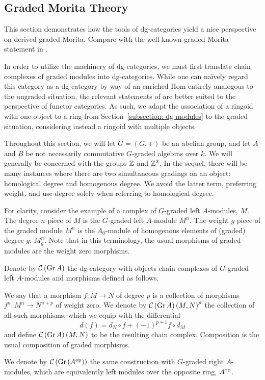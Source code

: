 \documentclass[dissertation.tex]{subfiles}
\begin{document}
\subsection{Graded Morita Theory} \label{subsection: graded Morita}

This section demonstrates how the tools of dg-categories yield a nice perspective on derived graded Morita. Compare with the well-known graded Morita statement in \cite{Zhang}. 

In order to utilize the machinery of dg-categories, we must first translate chain complexes of graded modules into dg-categories.
While one can na\"ively regard this category as a dg-category by way of an enriched Hom entirely analogous to the ungraded situation, the relevant statements of \cite{Toen} are better suited to the perspective of functor categories.
As such, we adapt the association of a ringoid with one object to a ring from Section~\ref{subsection: dg modules} to the graded situation, considering instead a ringoid with multiple objects.

Throughout this section, we will let \(G = (G, +)\) be an abelian group, and let \(A\) and \(B\) be not necessarily commutative \(G\)-graded algebras over \(k\).
We will generally be concerned with the groups \(\mathbb{Z}\) and \(\mathbb{Z}^2\).
In the sequel, there will be many instances where there are two simultaneous gradings on an object: homological degree and homogenous degree. 
We avoid the latter term, preferring weight, and use degree solely when referring to homological degree.

For clarity, consider the example of a complex of \(G\)-graded left \(A\)-modules, \(M\).
The degree \(n\) piece of \(M\) is the \(G\)-graded left \(A\)-module \(M^n\).
The weight \(g\) piece of the graded module \(M^n\) is the \(A_0\)-module of homogenous elements of (graded) degree \(g\), \(M^n_g\).
Note that in this terminology, the usual morphisms of graded modules are the weight zero morphisms.

\begin{definition}
  Denote by \(\mathcal{C}\left(\operatorname{Gr}A\right)\) the dg-category with objects chain complexes of \(G\)-graded left \(A\)-modules and morphisms defined as follows.
  
  We say that a morphism \(f \colon M \to N\) of degree \(p\) is a collection of morphisms \(f^n \colon M^n \to N^{n+p}\) of weight zero.
  We denote by \(\mathcal{C}\left(\operatorname{Gr}A\right)\left(M,N\right)^p\) the collection of all such morphisms, which we equip with the differential
  \[d(f) = d_N \circ f + (-1)^{p+1}f \circ d_M\]
  and define \(\mathcal{C}\left(\operatorname{Gr}A\right)(M,N)\) to be the resulting chain complex.
  Composition is the usual composition of graded morphisms.

  We denote by \(\mathcal{C}\left(\operatorname{Gr}\left(A^{{\operatorname{op}}}\right)\right)\) the same construction with \(G\)-graded right \(A\)-modules, which are equivalently left modules over the opposite ring, \(A^{\operatorname{op}}\).
\end{definition}
\end{document}
